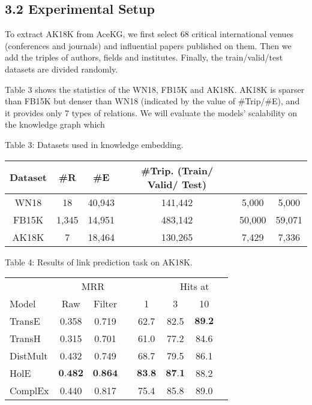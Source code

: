 \documentclass[10pt]{article}
\begin{document}
\subsection*{3.2 Experimental Setup}
To extract AK18K from AceKG, we first select 68 critical international venues (conferences and journals) and influential papers published on them. Then we add the triples of authors, fields and institutes. Finally, the train/valid/test datasets are divided randomly.

Table 3 shows the statistics of the WN18, FB15K and AK18K. AK18K is sparser than FB15K but denser than WN18 (indicated by the value of \#Trip/\#E), and it provides only 7 types of relations. We will evaluate the models' scalability on the knowledge graph which

Table 3: Datasets used in knowledge embedding.

\begin{center}
\begin{tabular}{c|ccccc}
\hline
Dataset & \#R & \#E & \multicolumn{1}{c}{\#Trip. (Train/ Valid/ Test)} &  &  \\
\hline
WN18 & 18 & 40,943 & 141,442 & 5,000 & 5,000 \\
FB15K & 1,345 & 14,951 & 483,142 & 50,000 & 59,071 \\
AK18K & 7 & 18,464 & 130,265 & 7,429 & 7,336 \\
\hline
\end{tabular}
\end{center}

Table 4: Results of link prediction task on AK18K.

\begin{center}
\begin{tabular}{lcccccc}
\hline
 & \multicolumn{3}{c}{MRR} &  & \multicolumn{3}{c}{Hits at} \\
\cline { 2 - 3 }\cline { 5 - 7 }
Model & Raw & Filter &  & 1 & 3 & 10 &  \\
\hline
TransE & 0.358 & 0.719 &  & 62.7 & 82.5 & $\mathbf{8 9 . 2}$ &  \\
TransH & 0.315 & 0.701 &  & 61.0 & 77.2 & 84.6 &  \\
DistMult & 0.432 & 0.749 &  & 68.7 & 79.5 & 86.1 &  \\
HolE & $\mathbf{0 . 4 8 2}$ & $\mathbf{0 . 8 6 4}$ &  & $\mathbf{8 3 . 8}$ & $\mathbf{8 7 . 1}$ & 88.2 &  \\
ComplEx & 0.440 & 0.817 &  & 75.4 & 85.8 & 89.0 &  \\
\hline
\end{tabular}
\end{center}
\end{document}
